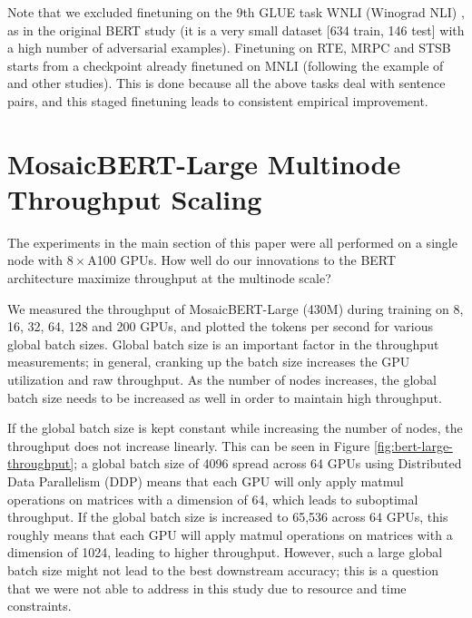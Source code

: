 Note that we excluded finetuning on the 9th GLUE task WNLI (Winograd NLI) \citep{levesque2012winograd}, as in the original BERT study (it is a very small dataset [634 train, 146 test] with a high number of adversarial examples). Finetuning on RTE, MRPC and STSB starts from a checkpoint already finetuned on MNLI (following the example of \cite{izsak2021train} and other studies). This is done because all the above tasks deal with sentence pairs, and this staged finetuning leads to consistent empirical improvement.



\section{MosaicBERT-Large Multinode Throughput Scaling}

The experiments in the main section of this paper were all performed on a single node with $8\times$A100 GPUs. How well do our innovations to the BERT architecture maximize throughput at the multinode scale?

We measured the throughput of MosaicBERT-Large (430M) during training on 8, 16, 32, 64, 128 and 200 GPUs, and plotted the tokens per second for various global batch sizes. Global batch size is an important factor in the throughput measurements; in general, cranking up the batch size increases the GPU utilization and raw throughput. As the number of nodes increases, the global batch size needs to be increased as well in order to maintain high throughput.

If the global batch size is kept constant while increasing the number of nodes, the throughput does not increase linearly. This can be seen in Figure \ref{fig:bert-large-throughput}; a global batch size of 4096 spread across 64 GPUs using Distributed Data Parallelism (DDP) means that each GPU will only apply matmul operations on matrices with a dimension of 64, which leads to suboptimal throughput. If the global batch size is increased to 65,536 across 64 GPUs, this roughly means that each GPU will apply matmul operations on matrices with a dimension of 1024, leading to higher throughput. However, such a large global batch size might not lead to the best downstream accuracy; this is a question that we were not able to address in this study due to resource and time constraints.

